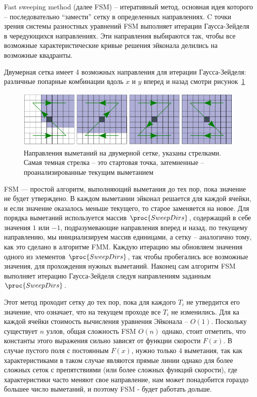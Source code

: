 \documentclass[a4paper,12pt]{article}
\begin{document}
Fast sweeping method (далее FSM) -- итеративный метод, основная идея
которого -- последовательно ``замести'' сетку в определенных
направлениях. C точки зрения системы разностных уравнений FSM
выполняет итерации Гаусса-Зейделя в чередующихся направлениях. Эти
направления выбираются так, чтобы все возможные характеристические
кривые решения эйконала делились на возможные квадранты.


Двумерная сетка имеет 4 возможных направления для итерации
Гаусса-Зейделя: различные попарные комбинации вдоль $x$ и $y$ вперед и
назад смотри рисунок~\ref{fig:fsm-sweeps}


\begin{figure}[H]
  \centering
  \includegraphics[width=\linewidth]{img/fsm-sweeps.png}
  \hfil \caption{Направления выметаний на двумерной сетке, указаны
    стрелками. Самая темная стрелка -- это стартовая точка,
    затемненные -- проанализированные текущим выметанием}
  \label{fig:fsm-sweeps}

\end{figure}

FSM --- простой алгоритм, выполняющий выметания до тех пор, пока
значение не будет утверждено. В каждом выметании эйконал решается для
каждой ячейки, и если значение оказалось меньше текущего, то старое
заменяется на новое. Для порядка выметаний используется массив
$\proc{SweepDirs}$, содержащий в себе значения $1$ или $-1$,
подразумевающие направления вперед и назад, по текущему направлению,
мы инициализируем массив единицами, а сетку -- аналогично тому, как
это сделано в алгоритме FMM. Каждую итерацию мы обновляем значения
одного из элементов $\proc{SweepDirs}$, так чтобы пробегались все
возможные значения, для прохождения нужных выметаний. Наконец сам
алгоритм FSM выполняет итерацию Гаусса-Зейделя следуя направлениям
заданным $\proc{SweepDirs}$.

Этот метод проходит сетку до тех пор, пока для каждого $T_i$ не утвердится
его значение, что означает, что на текущем проходе все $T_i$ не изменились.
Для ка каждой ячейки стоимость вычисления уравнения Эйконала -- $O(1)$.
Поскольку существует $n$ узлов, общая сложность FSM $O(n)$ однако, стоит
отметить, что константы этого выражения сильно зависят от функции скорости
$F(x)$. В случае пустого поля с постоянным $F(x)$, нужно только $4$
выметания, так как характеристиками в таком случае являются прямые линии
однако для более сложных сеток с препятствиями (или более сложных функций
скорости), где характеристики часто меняют свое направление, нам может
понадобится гораздо большее число выметаний, и поэтому FSM - будет работать
дольше.
\end{document}
